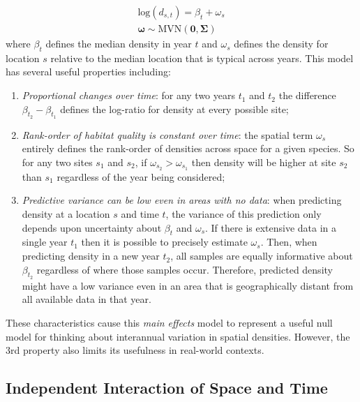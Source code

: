 \begin{equation}
\begin{gathered}
  \mathrm{log}( d_{s,t} ) = \beta_t + \omega_s \\
  \mathbf{\omega} \sim \mathrm{MVN}( \mathbf{0, \Sigma} )
\end{gathered}
\end{equation}
where \( \beta_t \) defines the median density in year \(t\) and \( \omega_s \) defines the density for location \(s\) relative to the median location that is typical across years.  This model has several useful properties including:
\begin{enumerate}
    \item \textit{Proportional changes over time}:  for any two years \( t_1 \) and \( t_2 \) the difference \( \beta_{t_2} - \beta_{t_1} \) defines the log-ratio for density at every possible site;

    \item \textit{Rank-order of habitat quality is constant over time}:  the spatial term \( \omega_s \) entirely defines the rank-order of densities across space for a given species.  So for any two sites \( s_1 \) and \( s_2 \), if \( \omega_{s_2} > \omega_{s_1} \) then density will be higher at site \(s_2\) than \(s_1\) regardless of the year being considered; 

    \item \textit{Predictive variance can be low even in areas with no data}:  when predicting density at a location \(s\) and time \(t\), the variance of this prediction only depends upon uncertainty about \(\beta_t\) and \(\omega_s\).  If there is extensive data in a single year \(t_1\) then it is possible to precisely estimate \(\omega_s\).  Then, when predicting density in a new year \(t_2\), all samples are equally informative about \(\beta_{t_2}\) regardless of where those samples occur.  Therefore, predicted density might have a low variance even in an area that is geographically distant from all available data in that year.  
\end{enumerate}
These characteristics cause this \textit{main effects} model to represent a useful null model for thinking about interannual variation in spatial densities.  However, the 3rd property also limits its usefulness in real-world contexts.  

\subsection{Independent Interaction of Space and Time} \label{sec:Chap8_independent_interaction}

